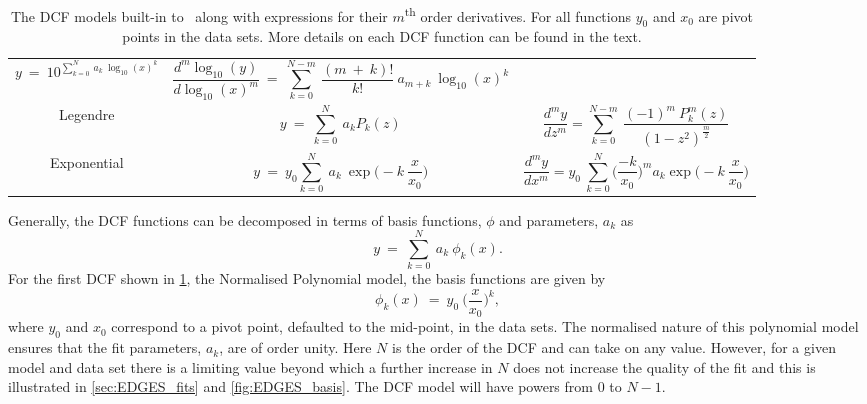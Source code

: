 \begin{landscape}
\begin{table}
\begin{tabular}{ccc}
{\begin{equation}
            y~=~10^{\sum_{k=0}^{N}~a_{k}~\log_{10}(x)^k}
            \label{eq:loglog_poly}
         \end{equation}}
         & \parbox{8cm}{\begin{equation*}
            \frac{d^m\log_{10}(y)}{d\log_{10}(x)^m}~=~\sum_{k=0}^{N-m}~\frac{(m~+~k)!}{k!}~a_{m+k}~\log_{10}(x)^k
         \end{equation*}} \\
         Legendre & \parbox{6cm}{\begin{equation}
            y~=~\sum_{k=0}^{N}~a_{k} P_k(z)
            \label{eq:legendre}
         \end{equation}}
         &  \parbox{8cm}{\begin{equation*} 
            \frac{d^my}{dz^m} = \sum_{k=0}^{N-m}~\frac{(-1)^m~P^m_k(z)}{(1-z^2)^{\frac{m}{2}}}
            \end{equation*}} \\
         Exponential 
         & \parbox{6cm}{\begin{equation}
            y~=~y_0\sum_{k=0}^{N}~a_{k}~\exp\bigg(-k~\frac{x}{x_0}\bigg)
         \label{eq:exponential}
         \end{equation}}
         & \parbox{8cm}{\begin{equation*}
            \frac{d^my}{dx^m} = y_0~\sum_{k=0}^{N} \bigg(\frac{-k}{x_0}\bigg)^m a_k \exp\bigg(-k~\frac{x}{x_0}\bigg)
         \end{equation*}}\\
    \end{tabular}
    \caption{The DCF models built-in to \maxsmooth~along with expressions for their $m$\textsuperscript{th} order derivatives. For all functions $y_0$ and $x_0$ are pivot points in the data sets. More details on each DCF function can be found in the text.}
    \label{tab:basis_functions}
\end{table}
\end{landscape}

Generally, the DCF functions can be decomposed in terms of basis functions, $\phi$ and parameters, $a_k$ as
\begin{equation}
    y~=~\sum_{k=0}^{N}~a_{k}~\phi_k(x).
    \label{eq:general_poly}
\end{equation}
For the first DCF shown in \cref{tab:basis_functions}, the Normalised Polynomial model, the basis functions are given by
\begin{equation}
    \phi_k(x)~=~y_0~\bigg(\frac{x}{x_0}\bigg)^k,
\end{equation} 
where $y_0$ and $x_0$ correspond to a pivot point, defaulted to the mid-point, in the data sets. The normalised nature of this polynomial model ensures that the fit parameters, $a_k$, are of order unity. Here $N$ is the order of the DCF and can take on any value. However, for a given model and data set there is a limiting value beyond which a further increase in $N$ does not increase the quality of the fit and this is illustrated in \cref{sec:EDGES_fits} and \cref{fig:EDGES_basis}. The DCF model will have powers from 0 to $N-1$.

